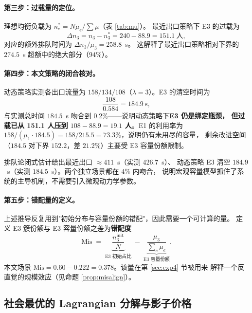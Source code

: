 \paragraph{第三步：过载量的定位。}
理想均衡负载为 $n_e^\ast=N\mu_e/\sum\mu$（表 \ref{tab:mu}）。
最近出口策略下 E3 的过载为
\begin{equation}
  \Delta n_3=n_3-n_3^\ast=240-88.9=151.1\ \text{人},
  \label{eq:overload}
\end{equation}
对应的额外排队时间为 $\Delta n_3/\mu_3=258.8$~s。
这解释了最近出口策略相对下界的 $274.5$~s 超额中的绝大部分（$94\%$）。

\paragraph{第四步：本文策略的闭合核对。}
动态策略实测各出口流量为 $158/134/108$（$\lambda=3$）。E3 的清空时间为
\begin{equation}
  \frac{108}{0.584}=184.9\ \text{s},
  \label{eq:dyn-est}
\end{equation}
与实测总时间 $184.5$~s 吻合到 $0.2\%$——说明动态策略下\textbf{E3 仍是绑定瓶颈，
但过载已从 151.1 人压到 $108-88.9=19.1$ 人}。E1 的利用率为
$158/(\mu_1\cdot184.5)=158/215.5=73.3\%$，说明仍有未用尽的容量，
剩余改进空间（$184.5$ 对下界 $152.2$，差 $21.2\%$）主要受 E3 容量份额限制。

\begin{csfkey}[闭合估计的验证结论]
排队论闭式估计给出最近出口 $\approx411$~s（实测 $426.7$~s）、
动态策略 E3 清空 $184.9$~s（实测 $184.5$~s）。两个独立场景都在 $4\%$ 内吻合，
说明宏观容量模型抓住了系统的主导机制，不需要引入微观动力学参数。
\end{csfkey}

\paragraph{第五步：错配量的定义。}
上述推导反复用到"初始分布与容量份额的错配"，因此需要一个可计算的量。
定义 E3 簇份额与 E3 容量份额之差为\textbf{错配度}
\begin{equation}
  \mathrm{Mis}
  \;=\;
  \underbrace{\frac{n_{3}^{\text{init}}}{N}}_{\text{E3 初始占比}}
  \;-\;
  \underbrace{\frac{\mu_3}{\sum_e\mu_e}}_{\text{E3 容量份额}} .
  \label{eq:mis}
\end{equation}
本文场景 $\mathrm{Mis}=0.60-0.222=0.378$。该量在第 \ref{sec:exp4} 节被用来
解释一个反直觉的规模效应（见命题 \ref{prop:misalign}）。

\subsection{社会最优的 Lagrangian 分解与影子价格}
\label{sec:lagrangian}

